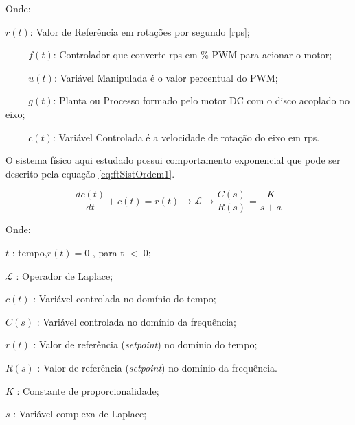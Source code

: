 Onde: 

\hspace{1cm} $r(t)$: Valor de Referência em rotações por segundo [rps];

$\hspace{1cm} f(t)$: Controlador que converte rps em \% PWM para acionar o motor;

$\hspace{1cm} u(t)$: Variável Manipulada é o valor percentual do PWM;

$\hspace{1cm} g(t)$: Planta ou Processo formado pelo motor DC com o disco acoplado no eixo;

$\hspace{1cm}  c(t)$: Variável Controlada é a velocidade de rotação do eixo em rps.




O sistema físico aqui estudado possui comportamento exponencial que pode ser descrito pela equação \ref{eq:ftSistOrdem1}. 






\begin{equation}
	 \frac{d c(t)}{dt} + c(t) = r(t) \rightarrow  \mathscr{L} \to \frac{C(s)}{R(s)} = \frac{K}{s + a} 
\label{eq:ftSistOrdem1}
\end{equation}

Onde:

\setlength{\parindent}{2cm}

$t$ : tempo,$ r(t) = 0$ , para t $<$ 0;

$\mathscr{L}$ : Operador de Laplace;

$c(t)$ : Variável controlada no domínio do tempo;

$C(s)$ : Variável controlada no domínio da frequência;

$r(t)$ : Valor de referência (\emph{setpoint}) no domínio do tempo;

$R(s)$ : Valor de referência (\emph{setpoint}) no domínio da frequência.

$K$ : Constante de proporcionalidade;

$s$ : Variável complexa de Laplace;

